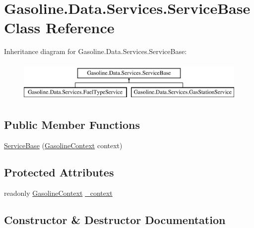 \hypertarget{class_gasoline_1_1_data_1_1_services_1_1_service_base}{}\section{Gasoline.\+Data.\+Services.\+Service\+Base Class Reference}
\label{class_gasoline_1_1_data_1_1_services_1_1_service_base}
Inheritance diagram for Gasoline.\+Data.\+Services.\+Service\+Base\+:\begin{figure}[H]
\begin{center}
\leavevmode
\includegraphics[height=2.000000cm]{class_gasoline_1_1_data_1_1_services_1_1_service_base}
\end{center}
\end{figure}
\subsection*{Public Member Functions}
\begin{DoxyCompactItemize}
\item 
\mbox{\hyperlink{class_gasoline_1_1_data_1_1_services_1_1_service_base_a4e721708b17c4ce312a58be4c243aee4}{Service\+Base}} (\mbox{\hyperlink{class_gasoline_1_1_data_1_1_e_f_1_1_gasoline_context}{Gasoline\+Context}} context)
\end{DoxyCompactItemize}
\subsection*{Protected Attributes}
\begin{DoxyCompactItemize}
\item 
readonly \mbox{\hyperlink{class_gasoline_1_1_data_1_1_e_f_1_1_gasoline_context}{Gasoline\+Context}} \mbox{\hyperlink{class_gasoline_1_1_data_1_1_services_1_1_service_base_abdf86048556d01a83e3a382c1508d17f}{\+\_\+context}}
\end{DoxyCompactItemize}


\subsection{Constructor \& Destructor Documentation}
\mbox{\label{class_gasoline_1_1_data_1_1_services_1_1_service_base_a4e721708b17c4ce312a58be4c243aee4}} 
